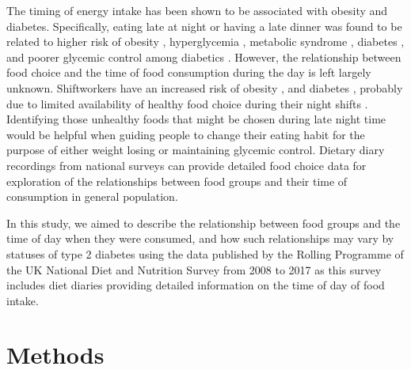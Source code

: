\documentclass{bmcart}
\begin{document}
The timing of energy intake has been shown to be associated with obesity and diabetes. \cite{almoosawi2016chrono} Specifically, eating late at night or having a late dinner was found to be related to higher risk of obesity \cite{xiao2019meal,yoshida2018association}, hyperglycemia \cite{nakajima2015association}, metabolic syndrome \cite{kutsuma2014potential}, diabetes \cite{mattson2014meal}, and poorer glycemic control among diabetics \cite{sakai2017late}. However, the relationship between food choice and the time of food consumption during the day is left largely unknown. Shiftworkers have an increased risk of obesity \cite{balieiro2014nutritional,barbadoro2013rotating}, and diabetes \cite{pan2011rotating}, probably due to limited availability of healthy food choice during their night shifts \cite{bonnell2017influences,balieiro2014nutritional}. Identifying those unhealthy foods that might be chosen during late night time would be helpful when guiding people to change their eating habit for the purpose of either weight losing or maintaining glycemic control. Dietary diary recordings from national surveys can provide detailed food choice data for exploration of the relationships between food groups and their time of consumption in general population.

In this study, we aimed to describe the relationship between food groups and the time of day when they were consumed, and how such relationships may vary by statuses of type 2 diabetes using the data published by the Rolling Programme of the UK National Diet and Nutrition Survey from 2008 to 2017 as this survey includes diet diaries providing detailed information on the time of day of food intake.

\section*{Methods}
\end{document}
